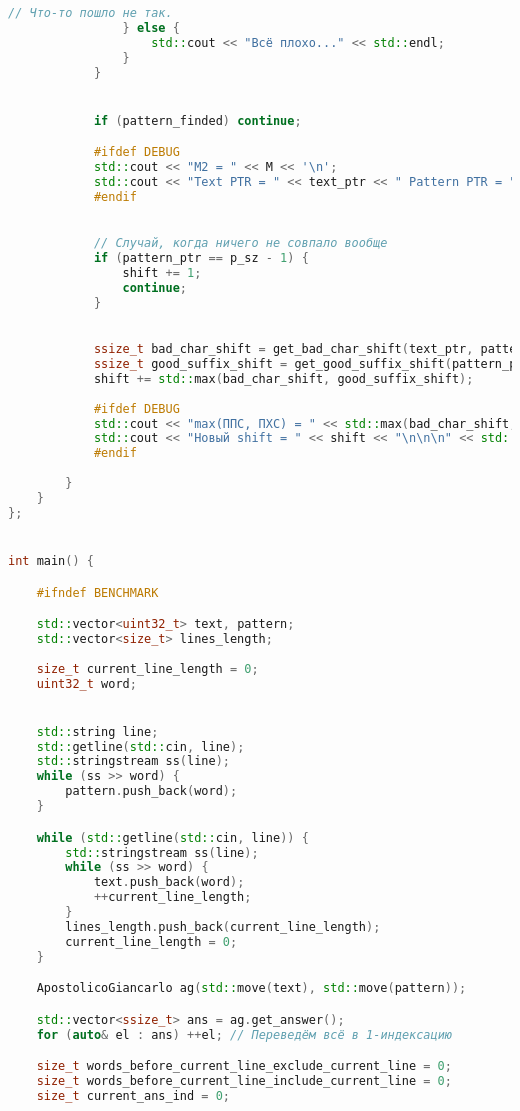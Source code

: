 \begin{lstlisting}[language=C++]
                // Что-то пошло не так.
                } else {
                    std::cout << "Всё плохо..." << std::endl;
                }
            }


            if (pattern_finded) continue;

            #ifdef DEBUG
            std::cout << "M2 = " << M << '\n';
            std::cout << "Text PTR = " << text_ptr << " Pattern PTR = " << pattern_ptr << std::endl;
            #endif
            

            // Случай, когда ничего не совпало вообще
            if (pattern_ptr == p_sz - 1) {
                shift += 1;
                continue;
            }
            

            ssize_t bad_char_shift = get_bad_char_shift(text_ptr, pattern_ptr);
            ssize_t good_suffix_shift = get_good_suffix_shift(pattern_ptr);
            shift += std::max(bad_char_shift, good_suffix_shift);
            
            #ifdef DEBUG
            std::cout << "max(ППС, ПХС) = " << std::max(bad_char_shift, good_suffix_shift) << '\n';
            std::cout << "Новый shift = " << shift << "\n\n\n" << std::endl;
            #endif
            
        }
    }
};


int main() {

    #ifndef BENCHMARK

    std::vector<uint32_t> text, pattern;
    std::vector<size_t> lines_length;
    
    size_t current_line_length = 0;
    uint32_t word;


    std::string line;
    std::getline(std::cin, line);
    std::stringstream ss(line);
    while (ss >> word) {
        pattern.push_back(word);
    }

    while (std::getline(std::cin, line)) {
        std::stringstream ss(line);
        while (ss >> word) {
            text.push_back(word);
            ++current_line_length;
        }
        lines_length.push_back(current_line_length);
        current_line_length = 0;
    }

    ApostolicoGiancarlo ag(std::move(text), std::move(pattern));

    std::vector<ssize_t> ans = ag.get_answer();
    for (auto& el : ans) ++el; // Переведём всё в 1-индексацию

    size_t words_before_current_line_exclude_current_line = 0;
    size_t words_before_current_line_include_current_line = 0;
    size_t current_ans_ind = 0;


\end{lstlisting}
